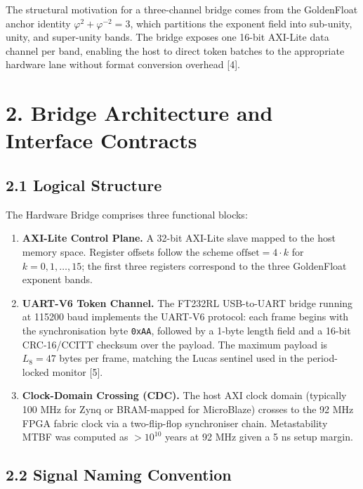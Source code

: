 The structural motivation for a three-channel
bridge comes from the GoldenFloat anchor identity
\(\varphi^2 + \varphi^{-2} = 3\), which partitions
the exponent field into sub-unity, unity, and
super-unity bands. The bridge exposes one 16-bit
AXI-Lite data channel per band, enabling the host
to direct token batches to the appropriate
hardware lane without format conversion overhead
[4].

\section{2. Bridge Architecture and Interface
Contracts}\label{fa_12:bridge-architecture-and-interface-contracts}

\subsection{2.1 Logical
Structure}\label{fa_12:logical-structure}

The Hardware Bridge comprises three functional
blocks:

\begin{enumerate}
\def\labelenumi{\arabic{enumi}.}
\item
  \textbf{AXI-Lite Control Plane.} A 32-bit
  AXI-Lite slave mapped to the host memory space.
  Register offsets follow the scheme
  \(\text{offset} = 4 \cdot k\) for
  \(k = 0, 1, \ldots, 15\); the first three
  registers correspond to the three GoldenFloat
  exponent bands.
\item
  \textbf{UART-V6 Token Channel.} The FT232RL
  USB-to-UART bridge running at 115200 baud
  implements the UART-V6 protocol: each frame
  begins with the synchronisation byte
  \texttt{0xAA}, followed by a 1-byte length field
  and a 16-bit CRC-16/CCITT checksum over the
  payload. The maximum payload is \(L_8 = 47\)
  bytes per frame, matching the Lucas sentinel
  used in the period-locked monitor [5].
\item
  \textbf{Clock-Domain Crossing (CDC).} The host
  AXI clock domain (typically 100 MHz for Zynq or
  BRAM-mapped for MicroBlaze) crosses to the 92
  MHz FPGA fabric clock via a two-flip-flop
  synchroniser chain. Metastability MTBF was
  computed as \(> 10^{10}\) years at 92 MHz given
  a 5 ns setup margin.
\end{enumerate}

\subsection{2.2 Signal Naming
Convention}\label{fa_12:signal-naming-convention}


